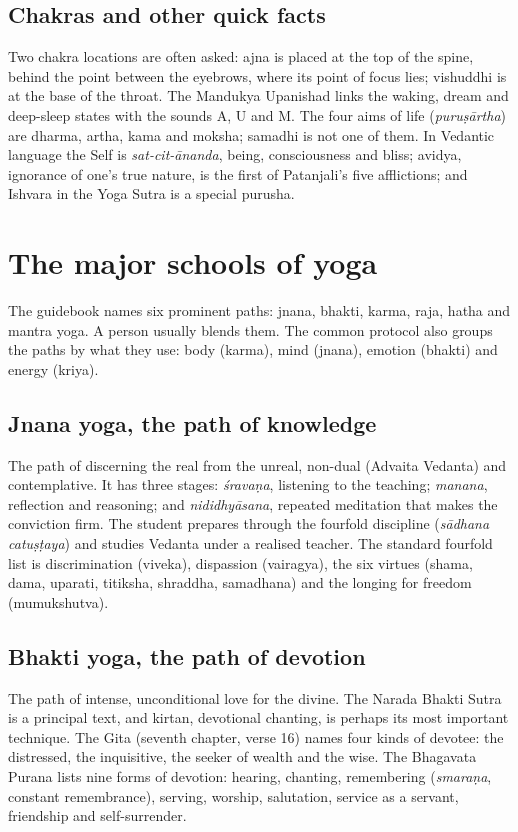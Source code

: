 \subsection*{Chakras and other quick facts}
Two chakra locations are often asked: ajna is placed at the top of the spine, behind the point between the eyebrows, where its point of focus lies; vishuddhi is at the base of the throat. The Mandukya Upanishad links the waking, dream and deep-sleep states with the sounds A, U and M. The four aims of life (\emph{puruṣārtha}) are dharma, artha, kama and moksha; samadhi is not one of them. In Vedantic language the Self is \emph{sat-cit-ānanda}, being, consciousness and bliss; avidya, ignorance of one's true nature, is the first of Patanjali's five afflictions; and Ishvara in the Yoga Sutra is a special purusha.

\section{The major schools of yoga}

The guidebook names six prominent paths: jnana, bhakti, karma, raja, hatha and mantra yoga. A person usually blends them. The common protocol also groups the paths by what they use: body (karma), mind (jnana), emotion (bhakti) and energy (kriya).

\subsection*{Jnana yoga, the path of knowledge}
The path of discerning the real from the unreal, non-dual (Advaita Vedanta) and contemplative. It has three stages: \emph{śravaṇa}, listening to the teaching; \emph{manana}, reflection and reasoning; and \emph{nididhyāsana}, repeated meditation that makes the conviction firm. The student prepares through the fourfold discipline (\emph{sādhana catuṣṭaya}) and studies Vedanta under a realised teacher. The standard fourfold list is discrimination (viveka), dispassion (vairagya), the six virtues (shama, dama, uparati, titiksha, shraddha, samadhana) and the longing for freedom (mumukshutva).

\subsection*{Bhakti yoga, the path of devotion}
The path of intense, unconditional love for the divine. The Narada Bhakti Sutra is a principal text, and kirtan, devotional chanting, is perhaps its most important technique. The Gita (seventh chapter, verse 16) names four kinds of devotee: the distressed, the inquisitive, the seeker of wealth and the wise. The Bhagavata Purana lists nine forms of devotion: hearing, chanting, remembering (\emph{smaraṇa}, constant remembrance), serving, worship, salutation, service as a servant, friendship and self-surrender.

